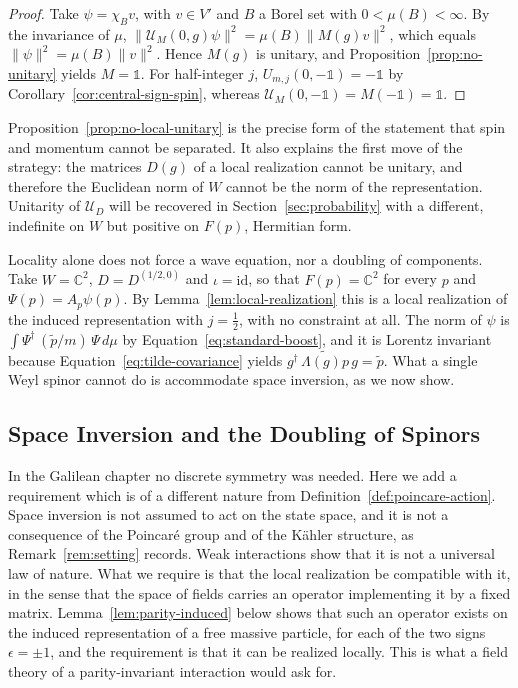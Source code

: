 	\begin{proof}
		Take $\psi=\chi_Bv$, with $v\in V'$ and $B$ a Borel set with $0<\mu(B)<\infty$. By the invariance of $\mu$, $\|\mathcal{U}_M(0,g)\psi\|^2=\mu(B)\|M(g)v\|^2$, which equals $\|\psi\|^2=\mu(B)\|v\|^2$. Hence $M(g)$ is unitary, and Proposition~\ref{prop:no-unitary} yields $M=\mathbb{1}$. For half-integer $j$, $U_{m,j}(0,-\mathbb{1})=-\mathbb{1}$ by Corollary~\ref{cor:central-sign-spin}, whereas $\mathcal{U}_M(0,-\mathbb{1})=M(-\mathbb{1})=\mathbb{1}$.
	\end{proof}
	
	\begin{remark}
		Proposition~\ref{prop:no-local-unitary} is the precise form of the statement that spin and momentum cannot be separated. It also explains the first move of the strategy: the matrices $D(g)$ of a local realization cannot be unitary, and therefore the Euclidean norm of $W$ cannot be the norm of the representation. Unitarity of $\mathcal{U}_D$ will be recovered in Section~\ref{sec:probability} with a different, indefinite on $W$ but positive on $F(p)$, Hermitian form.
	\end{remark}
	
	\begin{remark}\label{rem:weyl-realization}
		Locality alone does not force a wave equation, nor a doubling of components. Take $W=\mathbb{C}^2$, $D=D^{(1/2,0)}$ and $\iota=\mathrm{id}$, so that $F(p)=\mathbb{C}^2$ for every $p$ and $\Psi(p)=A_p\psi(p)$. By Lemma~\ref{lem:local-realization} this is a local realization of the induced representation with $j=\frac12$, with no constraint at all. The norm of $\psi$ is $\int\Psi^\dagger\,(\tilde{p}/m)\,\Psi\,d\mu$ by Equation~\eqref{eq:standard-boost}, and it is Lorentz invariant because Equation~\eqref{eq:tilde-covariance} yields $g^\dagger\,\widetilde{\Lambda(g)p}\,g=\tilde{p}$. What a single Weyl spinor cannot do is accommodate space inversion, as we now show.
	\end{remark}
	
	\subsection*{Space Inversion and the Doubling of Spinors}
	
	In the Galilean chapter no discrete symmetry was needed. Here we add a requirement which is of a different nature from Definition~\ref{def:poincare-action}. Space inversion is not assumed to act on the state space, and it is not a consequence of the Poincar\'e group and of the Kähler structure, as Remark~\ref{rem:setting} records. Weak interactions show that it is not a universal law of nature. What we require is that the local realization be compatible with it, in the sense that the space of fields carries an operator implementing it by a fixed matrix. Lemma~\ref{lem:parity-induced} below shows that such an operator exists on the induced representation of a free massive particle, for each of the two signs $\epsilon=\pm1$, and the requirement is that it can be realized locally. This is what a field theory of a parity-invariant interaction would ask for.
	
